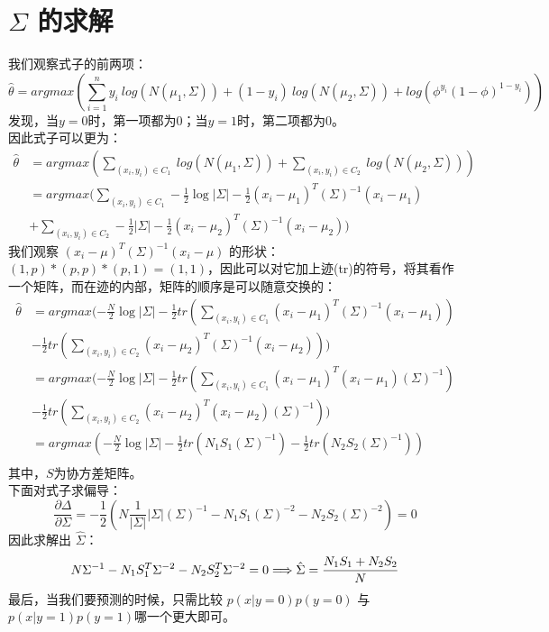 \documentclass{report}
\begin{document}
\section{$\Sigma$ 的求解}
我们观察式子的前两项：
$$
\hat{\theta}=argmax(\sum_{i=1}^n y_i\ log(N(\mu_1,\Sigma))+(1-y_i)\ log(N(\mu_2,\Sigma))+log(\phi^{y_i} (1-\phi)^{1-y_i}))
$$
发现，当$y=0$时，第一项都为$0$；当$y=1$时，第二项都为$0$。\\
因此式子可以更为：
$$
\begin{aligned}
\hat{\theta}
&=argmax(\sum_{(x_i,y_i)\in C_1} \ log(N(\mu_1,\Sigma))+\sum_{(x_i,y_i)\in C_2}\ log(N(\mu_2,\Sigma)))\\
&=argmax(\sum_{(x_i,y_i)\in C_1} -\frac{1}{2}\log|\Sigma|-\frac{1}{2}(x_i-\mu_1)^T(\Sigma)^{-1}(x_i-\mu_1) \\
&+\sum_{(x_i,y_i)\in C_2} -\frac{1}{2}|\Sigma|-\frac{1}{2}(x_i-\mu_2)^T(\Sigma)^{-1}(x_i-\mu_2))
\end{aligned}
$$
我们观察 $(x_i-\mu)^T(\Sigma)^{-1}(x_i-\mu)$ 的形状：$(1,p)* (p,p) * (p,1)=(1,1)$，因此可以对它加上迹(tr)的符号，将其看作一个矩阵，而在迹的内部，矩阵的顺序是可以随意交换的：
$$
\begin{aligned}
\hat{\theta}
&=argmax(-\frac{N}{2}\log|\Sigma|-\frac{1}{2}tr(\sum_{(x_i,y_i)\in C_1}(x_i-\mu_1)^T(\Sigma)^{-1}(x_i-\mu_1))\\
&-\frac{1}{2}tr(\sum_{(x_i,y_i)\in C_2}(x_i-\mu_2)^T(\Sigma)^{-1}(x_i-\mu_2)))\\
&=argmax(-\frac{N}{2}\log|\Sigma|-\frac{1}{2}tr(\sum_{(x_i,y_i)\in C_1}(x_i-\mu_1)^T(x_i-\mu_1)(\Sigma)^{-1})\\
&-\frac{1}{2}tr(\sum_{(x_i,y_i)\in C_2}(x_i-\mu_2)^T(x_i-\mu_2)(\Sigma)^{-1}))\\
&=argmax(-\frac{N}{2}\log|\Sigma|-\frac{1}{2}tr(N_1 S_1(\Sigma)^{-1})
-\frac{1}{2}tr(N_2 S_2(\Sigma)^{-1}))\\
\end{aligned}
$$
其中，$S$为协方差矩阵。\\
下面对式子求偏导：
$$
\frac{\partial \Delta}{\partial \Sigma}=-\frac{1}{2}(N \frac{1}{|\Sigma|}|\Sigma|(\Sigma)^{-1}-N_1S_1(\Sigma)^{-2}-N_2S_2(\Sigma)^{-2})=0
$$
因此求解出 $\hat{\Sigma}$：
$$
N \Sigma^{-1}-N_{1} S_{1}^{T} \Sigma^{-2}-N_{2} S_{2}^{T} \Sigma^{-2}=0\\
\Longrightarrow \hat{\Sigma}=\frac{N_{1} S_{1}+N_{2} S_{2}}{N}
$$
最后，当我们要预测的时候，只需比较 $p(x|y=0)p(y=0)$ 与 $p(x|y=1)p(y=1)$哪一个更大即可。
\end{document}
